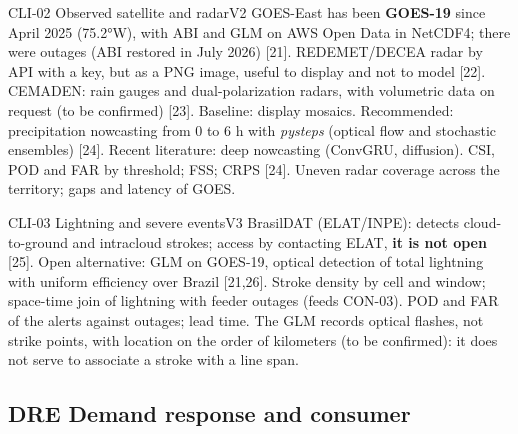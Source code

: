 \begin{ficha}{CLI-02 \textperiodcentered{} Observed satellite and radar}{V2}
 GOES-East has been \textbf{GOES-19} since April 2025 (75.2°W),
with ABI and GLM on AWS Open Data in NetCDF4; there were outages (ABI restored
in July 2026) [21]. REDEMET/DECEA radar by API with a key, but as a PNG
image, useful to display and not to model [22]. CEMADEN: rain gauges and
dual-polarization radars, with volumetric data on request (to be confirmed)
[23].
 Baseline: display mosaics. Recommended: precipitation
nowcasting from 0 to 6 h with \emph{pysteps} (optical flow and stochastic
ensembles) [24]. Recent literature: deep nowcasting (ConvGRU, diffusion).
 CSI, POD and FAR by threshold; FSS; CRPS [24].
 Uneven radar coverage across the territory; gaps and
latency of GOES.
\end{ficha}

\begin{ficha}{CLI-03 \textperiodcentered{} Lightning and severe events}{V3}
 BrasilDAT (ELAT/INPE): detects cloud-to-ground and
intracloud strokes; access by contacting ELAT, \textbf{it is not open} [25].
Open alternative: GLM on GOES-19, optical detection of total lightning with
uniform efficiency over Brazil [21,26].
 Stroke density by cell and window; space-time
join of lightning with feeder outages (feeds
CON-03).
 POD and FAR of the alerts against outages; lead time.
 The GLM records optical flashes, not strike points, with
location on the order of kilometers (to be confirmed): it does not serve to associate
a stroke with a line span.
\end{ficha}

\subsection{DRE \textperiodcentered{} Demand response and consumer}

